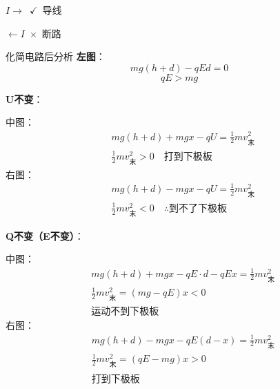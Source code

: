 $I\to$\ $\checkmark$\ 导线

$\leftarrow I$\ $\times$\ 断路

化简电路后分析
\textbf{左图}：
\[
mg(h+d)-qEd=0
\]
\[
qE>mg
\]

\textbf{U不变}：

中图：
\begin{align*}
&mg(h+d)+mgx-qU=\tfrac{1}{2}mv_{\text{末}}^2\\
&\tfrac{1}{2}mv_{\text{末}}^2>0\quad\text{打到下极板}
\end{align*}
右图：
\begin{align*}
&mg(h+d)-mgx-qU=\tfrac{1}{2}mv_{\text{末}}^2\\
&\tfrac{1}{2}mv_{\text{末}}^2<0\quad\therefore\text{到不了下极板}
\end{align*}

\textbf{Q不变（E不变）}：

中图：
\begin{align*}
&mg(h+d)+mgx-qE\cdot d-qEx=\tfrac{1}{2}mv_{\text{末}}^2\\
&\tfrac{1}{2}mv_{\text{末}}^2=(mg-qE)x<0\\
&\text{运动不到下极板}
\end{align*}
右图：
\begin{align*}
&mg(h+d)-mgx-qE(d-x)=\tfrac{1}{2}mv_{\text{末}}^2\\
&\tfrac{1}{2}mv_{\text{末}}^2=(qE-mg)x>0\\
&\text{打到下极板}
\end{align*}
